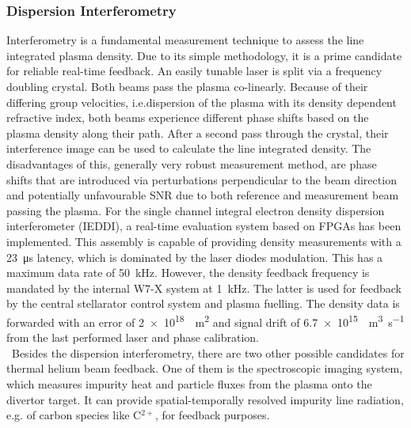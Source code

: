         \subsubsection*{Dispersion Interferometry}%
%
            Interferometry is a fundamental measurement technique to assess the line integrated plasma density. Due to its simple methodology, it is a prime candidate for reliable real-time feedback\cite{Mlynek2010,Boboc2012}. An easily tunable laser is split via a frequency doubling crystal. Both beams pass the plasma co-linearly. Because of their differing group velocities, i.e.dispersion of the plasma with its density dependent refractive index, both beams experience different phase shifts based on the plasma density along their path. After a second pass through the crystal, their interference image can be used to calculate the line integrated density. The disadvantages of this, generally very robust measurement method, are phase shifts that are introduced via perturbations perpendicular to the beam direction and potentially unfavourable SNR due to both reference and measurement beam passing the plasma\cite{Knauer2016}. For the single channel integral electron density dispersion interferometer (IEDDI), a real-time evaluation system based on FPGAs has been implemented. This assembly is capable of providing density measurements with a \SI{23}{\micro\second} latency, which is dominated by the laser diodes modulation. This has a maximum data rate of \SI{50}{\kilo\hertz}. However, the density feedback frequency is mandated by the internal W7-X system at \SI{1}{\kilo\hertz}. The latter is used for feedback by the central stellarator control system and plasma fuelling\cite{Spring2017}. The density data is forwarded with an error of \SI{2e18}{\per\square\meter} and signal drift of \SI{6.7e15}{\per\cubic\meter\per\second} from the last performed laser and phase calibration\cite{Brunner2018}.\\%

        \,\newline%
        Besides the dispersion interferometry, there are two other possible candidates for thermal helium beam feedback. One of them is the spectroscopic imaging system, which measures impurity heat and particle fluxes from the plasma onto the divertor target. It can provide spatial-temporally resolved impurity line radiation, e.g. of carbon species like C$^{2+}$, for feedback purposes.%
%
